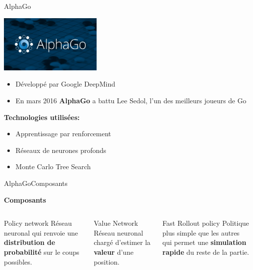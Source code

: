 

\begin{frame}{AlphaGo}
    \begin{center}

        \includegraphics[width=5cm]{ressources/AlphaGo/AlphaGoLogo}
    \end{center}
    \begin{block}{}
        \begin{itemize}
            \item Développé par Google DeepMind
            \item En mars 2016 \textbf{AlphaGo} a battu Lee Sedol, l'un des meilleurs joueurs de Go
        \end{itemize}
    \end{block}
    \begin{exampleblock}{\textbf{Technologies utilisées:}}
        \begin{itemize}
            \item Apprentissage par renforcement
            \item Réseaux de neurones profonds
            \item Monte Carlo Tree Search
        \end{itemize}
    \end{exampleblock}
\end{frame}



\begin{frame}{AlphaGo}{Composants}
    \begin{center}
        \textbf{Composants}
    \end{center}
    \begin{columns}[t]
        \begin{column}{.3\textwidth}
            \begin{block}{Policy network}
                Réseau neuronal qui renvoie une \textbf{distribution de probabilité} sur le coups possibles.
            \end{block}
        \end{column}
        \begin{column}{.3\textwidth}
            \begin{block}{Value Network}
                Réseau neuronal chargé d'estimer la \textbf{valeur} d'une position.            \end{block}
        \end{column}
        \begin{column}{.3\textwidth}
            \begin{block}{Fast Rollout policy}
                Politique plus simple que les autres qui permet une \textbf{simulation rapide} du reste de la partie.
            \end{block}
        \end{column}
    \end{columns}
\end{frame}

